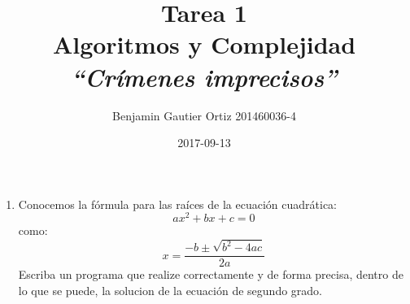 \documentclass[spanish, fleqn]{article}
\title{Tarea 1\\
       \large Algoritmos y Complejidad\\[3ex]
       \emph{``Crímenes imprecisos''}}
\author{Benjamin Gautier Ortiz 201460036-4}
\date{2017-09-13}
\begin{document}
\maketitle

  \begin{enumerate}
  \item %
    Conocemos la fórmula para las raíces de la ecuación cuadrática:
    \begin{equation*}
      a x^2 + b x + c
        = 0
    \end{equation*}
    como:
    \begin{equation*}
      x
        = \frac{-b \pm \sqrt{b^2 - 4 a c}}{2 a}
    \end{equation*}
    Escriba un programa que realize correctamente y de forma precisa, dentro de lo que se puede, la solucion de la ecuaci\'on de segundo grado.

\end{enumerate}
\end{document}
